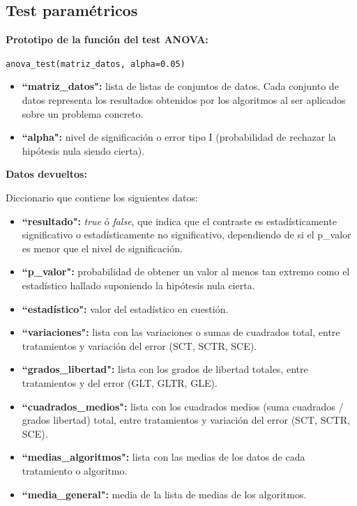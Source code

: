 \subsection{Test paramétricos}

\noindent
\textbf{Prototipo de la función del test ANOVA:}

\texttt{anova\_test(matriz\_datos, alpha=0.05)}

\begin{itemize}
\item \textbf{``matriz\_datos":} lista de listas de conjuntos de datos. Cada conjunto de datos representa los resultados obtenidos por los algoritmos al ser aplicados sobre un problema concreto.
\item \textbf{``alpha":} nivel de significación o error tipo I (probabilidad de rechazar la hipótesis nula siendo cierta).
\end{itemize}

\noindent
\textbf{Datos devueltos:}

Diccionario que contiene los siguientes datos:

\begin{itemize}
\item \textbf{``resultado":} \textit{true} ó \textit{false}, que indica que el contraste es estadísticamente significativo o estadísticamente no significativo, dependiendo de si el p\_valor es menor que el nivel de significación.
\item \textbf{``p\_valor":} probabilidad de obtener un valor al menos tan extremo como el estadístico hallado suponiendo la hipótesis nula cierta.
\item \textbf{``estadístico":} valor del estadístico en cuestión.
\item \textbf{``variaciones":} lista con las variaciones o sumas de cuadrados total, entre tratamientos y variación del error (SCT, SCTR, SCE).
\item \textbf{``grados\_libertad":} lista con los grados de libertad totales, entre tratamientos y del error (GLT, GLTR, GLE).
\item \textbf{``cuadrados\_medios":} lista con los cuadrados medios (suma cuadrados / grados libertad) total, entre tratamientos y variación del error (SCT, SCTR, SCE).
\item \textbf{``medias\_algoritmos":} lista con las medias de los datos de cada tratamiento o algoritmo.
\item \textbf{``media\_general":} media de la lista de medias de los algoritmos.
\end{itemize}

